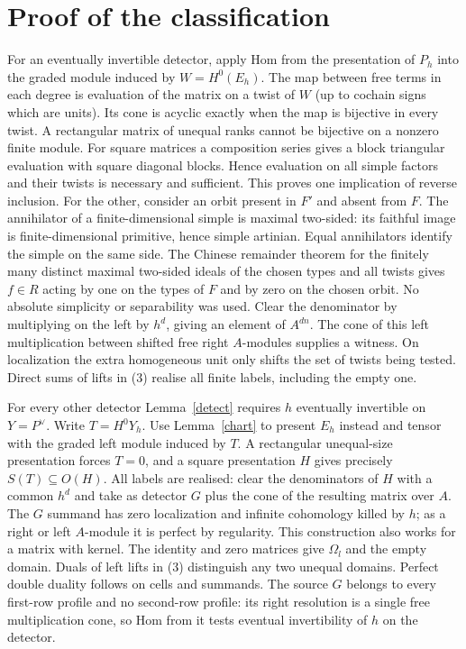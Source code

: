 \documentclass[11pt]{article}
\begin{document}
\section{Proof of the classification}
For an eventually invertible detector, apply Hom from the presentation
of $P_h$ into the graded module induced by $W=H^0(E_h)$. The map between
free terms in each degree is evaluation of the matrix on a twist of $W$
(up to cochain signs which are units). Its cone is acyclic exactly when
the map is bijective in every twist. A rectangular matrix of unequal
ranks cannot be bijective on a nonzero finite module. For square
matrices a composition series gives a block triangular evaluation with
square diagonal blocks. Hence evaluation on all simple factors and their
twists is necessary and sufficient. This proves one implication of
reverse inclusion. For the other, consider an orbit present in $F'$
and absent from $F$. The annihilator of a finite-dimensional simple
is maximal two-sided: its faithful image is finite-dimensional primitive,
hence simple artinian. Equal annihilators identify the simple on the
same side. The Chinese remainder theorem for the finitely many distinct
maximal two-sided ideals of the chosen types and all twists gives
$f\in R$ acting by one on the types of $F$ and by zero on the chosen
orbit. No absolute simplicity or separability was used. Clear the
denominator by multiplying on the left by $h^d$, giving an element
of $A^{dn}$. The cone of this left multiplication between shifted
free right $A$-modules supplies a witness. On localization the extra
homogeneous unit only shifts the set of twists being tested. Direct
sums of lifts in (3) realise all finite labels, including the empty one.

For every other detector Lemma~\ref{detect} requires $h$ eventually
invertible on $Y=P^\vee$. Write $T=H^0Y_h$. Use
Lemma~\ref{chart} to present $E_h$ instead and tensor with the graded
left module induced by $T$. A rectangular unequal-size presentation
forces $T=0$, and a square presentation $H$ gives precisely
$S(T)\subseteq O(H)$. All labels are realised: clear the denominators of
$H$ with a common $h^d$ and take as detector $G$ plus the cone of the
resulting matrix over $A$. The $G$ summand has zero localization and
infinite cohomology killed by $h$; as a right or left $A$-module it
is perfect by regularity. This construction also works for a matrix
with kernel. The identity and zero matrices give $\Omega_l$ and the
empty domain. Duals of left lifts in (3) distinguish any two unequal
domains. Perfect double duality follows on cells and summands.
The source $G$ belongs to every first-row profile and no second-row
profile: its right resolution is a single free multiplication cone,
so Hom from it tests eventual invertibility of $h$ on the detector.
\end{document}
